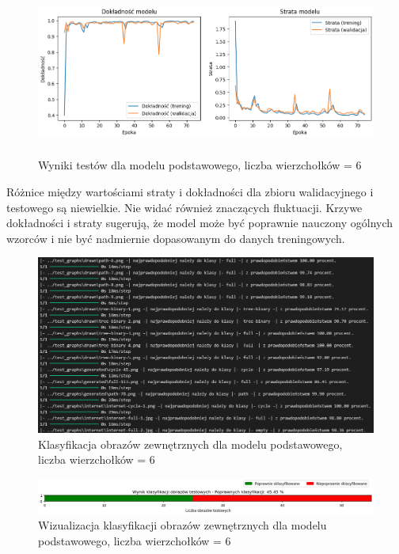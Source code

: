 \begin{figure}[ht]
	\centering
	\includegraphics[height=5.5cm]{resources/tests/images/v3/base6_img.png}
	\caption{Wyniki testów dla modelu podstawowego, liczba wierzchołków = 6}
	\label{Fig:tests-base-3a}
\end{figure}
\FloatBarrier

Różnice między wartościami straty i dokładności dla zbioru walidacyjnego i testowego są niewielkie.
Nie widać również znaczących fluktuacji.
Krzywe dokładności i straty sugerują, że model może być poprawnie nauczony ogólnych wzorców
i nie być nadmiernie dopasowanym do danych treningowych.

\begin{figure}[ht]
	\centering
	\includegraphics[width=14cm]{resources/tests/images/v3/base6_txt.png}
	\caption{Klasyfikacja obrazów zewnętrznych dla modelu podstawowego, liczba wierzchołków = 6}
	\label{Fig:tests-base-3b}
\end{figure}
\FloatBarrier

\begin{figure}[ht]
	\centering
	\includegraphics[width=14cm]{resources/tests/images/v3/base6_bar.png}
	\caption{Wizualizacja klasyfikacji obrazów zewnętrznych dla modelu podstawowego, liczba wierzchołków = 6}
	\label{Fig:tests-base-3c}
\end{figure}
\FloatBarrier

